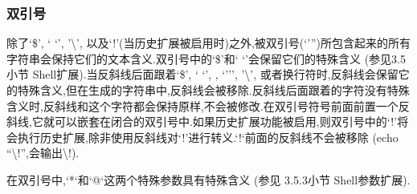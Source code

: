 \documentclass[draft,openany]{book}
\begin{document}
\begin{CJK}{UTF8}{gbsn}
    \subsubsection{双引号}
    除了`\$', ` `', '\textbackslash', 以及`!'(当历史扩展被启用时)之外,被双引号(`''')所包含起来的所有字符串会保持它们的文本含义.双引号中的`\$'和` `'会保留它们的特殊含义 (参见3.5小节 Shell扩展).当反斜线后面跟着`\$', ` `', , `''', '\textbackslash', 或者换行符时,反斜线会保留它的特殊含义,但在生成的字符串中,反斜线会被移除.反斜线后面跟着的字符没有特殊含义时,反斜线和这个字符都会保持原样,不会被修改.在双引号符号前面前置一个反斜线,它就可以嵌套在闭合的双引号中.如果历史扩展功能被启用,则双引号中的`!'将会执行历史扩展,除非使用反斜线对`!'进行转义.`!`前面的反斜线不会被移除 (echo ``\textbackslash !'',会输出\textbackslash !).\par
    在双引号中,`*`和`@`这两个特殊参数具有特殊含义 (参见 3.5.3小节 Shell参数扩展).


\end{CJK}
\end{document}
